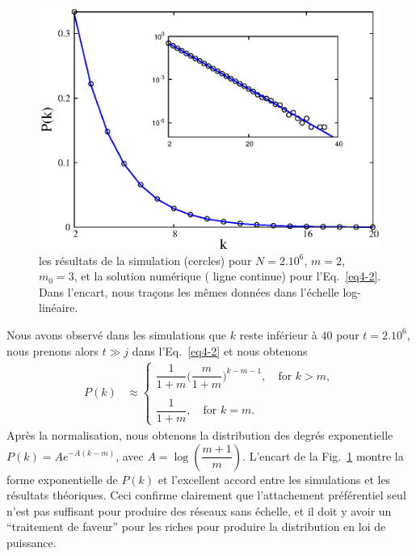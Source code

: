 \begin{figure}[h]
	\centering
	\includegraphics{./figures/fig1}
	\caption{les résultats de la simulation (cercles)  pour $N=2.10^6$, $m=2$, $m_0=3$, et la solution numérique (	ligne continue) pour l'Eq.~\eqref{eq4-2}. Dans l'encart, nous traçons les mêmes données dans l'échelle log-linéaire.}
	\label{fig1-2}
\end{figure} 
Nous avons observé dans les simulations que $k$ reste inférieur à $40$ pour $t=2.10^6$, nous prenons alors $t\gg j $ dans l'Eq.~\eqref{eq4-2} et nous obtenons
\begin{align}
P(k)&\approx 
\begin{cases}
\dfrac{1}{1+m}\Big(\dfrac{m}{1+m}\Big)^{k-m-1}, \quad \textrm{for }  k>m,\\
\\
\dfrac{1}{1+m}, \quad\textrm{for }  k=m.
\end{cases}
\label{eq5-2}
\end{align}
Après la normalisation, nous obtenons la distribution des degrés exponentielle $P(k)=Ae^{-A(k-m)}$, avec $A=\log(\dfrac{m+1}{m})$.
L'encart de la Fig.~\ref{fig1-2} montre la forme exponentielle de $ P(k)$ et l'excellent accord entre les simulations et les résultats théoriques.
Ceci confirme clairement que l'attachement préférentiel seul n'est pas suffisant pour produire des réseaux sans échelle, et il doit y avoir un ``traitement de faveur'' pour les riches pour produire la distribution en loi de puissance. 

